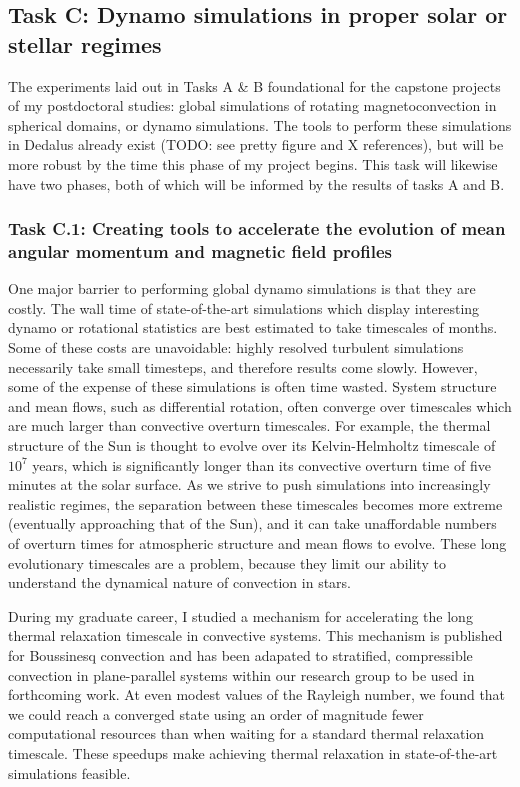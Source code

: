\documentclass[aasms,12pt]{article}
\begin{document}
\subsection{Task C: Dynamo simulations in proper solar or stellar regimes}
\label{sct:global_models}
The experiments laid out in Tasks A \& B foundational for the capstone projects of my postdoctoral studies: global simulations of rotating magnetoconvection in spherical domains, or dynamo simulations.
The tools to perform these simulations in Dedalus already exist (TODO: see pretty figure and X references), but will be more robust by the time this phase of my project begins.
This task will likewise have two phases, both of which will be informed by the results of tasks A and B.

\subsubsection{Task C.1: Creating tools to accelerate the evolution of mean angular momentum and magnetic field profiles}
One major barrier to performing global dynamo simulations is that they are costly.
The wall time of state-of-the-art simulations which display interesting dynamo or rotational statistics are best estimated to take timescales of months.
Some of these costs are unavoidable: highly resolved turbulent simulations necessarily take small timesteps, and therefore results come slowly.
However, some of the expense of these simulations is often time wasted.
System structure and mean flows, such as differential rotation, often converge over timescales which are much larger than convective overturn timescales.
For example, the thermal structure of the Sun is thought to evolve over its Kelvin-Helmholtz timescale of $10^7$ years, which is significantly longer than its convective overturn time of five minutes at the solar surface.
As we strive to push simulations into increasingly realistic regimes, the separation between these timescales becomes more extreme (eventually approaching that of the Sun), and it can take unaffordable numbers of overturn times for atmospheric structure and mean flows to evolve.
These long evolutionary timescales are a problem, because they limit our ability to understand the dynamical nature of convection in stars.

During my graduate career, I studied a mechanism for accelerating the long thermal relaxation timescale in convective systems.
This mechanism is published for Boussinesq convection \citep{anders&all2018} and has been adapated to stratified, compressible convection in plane-parallel systems within our research group to be used in forthcoming work.
At even modest values of the Rayleigh number, we found that we could reach a converged state using an order of magnitude fewer computational resources than when waiting for a standard thermal relaxation timescale.
These speedups make achieving thermal relaxation in state-of-the-art simulations feasible.
\end{document}
